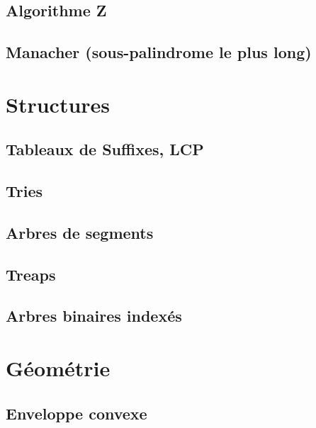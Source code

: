 \documentclass[12pt]{article}
\begin{document}
\subsection{Algorithme Z}
{\scriptsize}

\subsection{Manacher (sous-palindrome le plus long)}
{\scriptsize}


\section{Structures}
\subsection{Tableaux de Suffixes, LCP}
{\scriptsize}

\subsection{Tries}
{\scriptsize}

\subsection{Arbres de segments}
{\scriptsize}

\subsection{Treaps}
{\scriptsize}

\subsection{Arbres binaires indexés}
{\scriptsize}


\section{Géométrie}
\subsection{Enveloppe convexe}
{\scriptsize}
\end{document}
